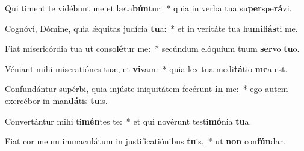 \item Qui timent te vidébunt me et læta\textbf{bún}tur:~* quia in verba tua su\textbf{per}spe\textbf{rá}vi.
\item Cognóvi, Dómine, quia ǽquitas judícia \textbf{tu}a:~* et in veritáte tua hu\textbf{mi}li\textbf{ás}ti me.
\item Fiat misericórdia tua ut conso\textbf{lé}tur me:~* secúndum elóquium tuum \textbf{ser}vo \textbf{tu}o.
\item Véniant mihi miseratiónes tuæ, et \textbf{vi}vam:~* quia lex tua medi\textbf{tá}tio \textbf{me}a est.
\item Confundántur supérbi, quia injúste iniquitátem fecérunt \textbf{in} me:~* ego autem exercébor in man\textbf{dá}tis \textbf{tu}is.
\item Convertántur mihi ti\textbf{mén}tes te:~* et qui novérunt testi\textbf{mó}nia \textbf{tu}a.
\item Fiat cor meum immaculátum in justificatiónibus \textbf{tu}is,~* ut \textbf{non} con\textbf{fún}dar.
